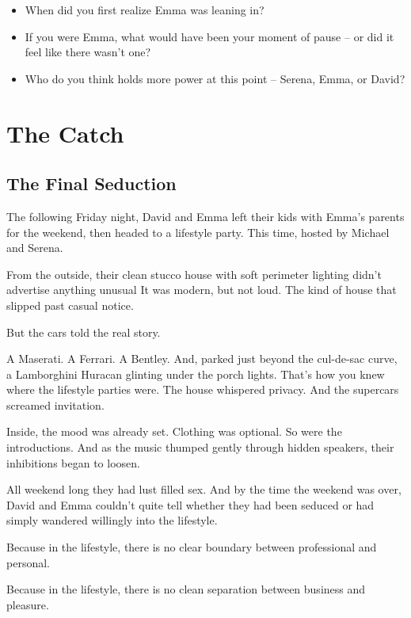 \begin{itemize}
  \item When did you first realize Emma was leaning in?
  \item If you were Emma, what would have been your moment of pause -- or did it feel like there wasn’t one?
  \item Who do you think holds more power at this point -- Serena, Emma, or David?
\end{itemize}







\section{The Catch}

\subsection{The Final Seduction}

The following Friday night, David and Emma left their kids with Emma's parents for the weekend,
then headed to a lifestyle party. This time, hosted by Michael and Serena.

From the outside, their clean stucco house with soft perimeter lighting didn’t advertise anything unusual
It was modern, but not loud. The kind of house that slipped past casual notice.

But the cars told the real story.

A Maserati. A Ferrari. A Bentley. And, parked just beyond the cul-de-sac curve, a Lamborghini Huracan glinting 
under the porch lights.
That’s how you knew where the lifestyle parties were. The house whispered privacy. And the supercars screamed 
invitation.

Inside, the mood was already set. Clothing was optional. So were the introductions.
And as the music thumped gently through hidden speakers, their inhibitions began to loosen.

All weekend long they had lust filled sex. And by the time the weekend was over, David and 
Emma couldn’t quite tell whether they had been seduced or had simply wandered willingly into the lifestyle.

Because in the lifestyle, there is no clear boundary between professional and personal.  

Because in the lifestyle, there is no clean separation between business and pleasure.  

